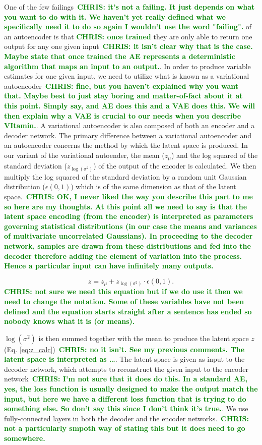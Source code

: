 \documentclass[%
showpacs,
 amsmath,amssymb,
 aps,
 twocolumn,
 prl,
 reprint,
floatfix,
]{revtex4-1}
\newcommand{\chris}[1]{\textbf{\textcolor{green}{CHRIS: #1}}}
\begin{document}
%
%
One of the few failings~\chris{it's not a failing. It just depends on what you
want to do with it. We haven't yet really defined what we specifically need it
to do so again I wouldn't use the word "failing".} of an autoencoder is that
\chris{once trained} they are only able to return one output for any one given
input~\chris{it isn't clear why that is the case. Maybe state that once trained
the AE represents a deterministic algorithm that maps an input to an output.}.
In order to produce variable estimates for one given input, we need to utilize
what is known as a variational autoencoder~\cite{1812.04405}\chris{fine, but
you haven't explained why you want that. Maybe best to just stay boring and
matter-of-fact about it at this point. Simply say, and AE does this and a VAE
does this. We will then explain why a VAE is crucial to our needs when you
describe VItamin.}. A variational autoencoder is also composed of both an
encoder and a decoder network. The primary difference between a variational
autoencoder and an autoencoder concerns the method by which the latent space is
produced. In our variant of the variational autoender, the mean ($z_{\mu}$) and
the log squared of the standard deviation ($z_{\log{(\sigma^{2})}}$) of the
output of the encoder is calculated. We then multiply the log squared of the
standard deviation by a random unit Gaussian distribution ($\epsilon(0,1)$)
which is of the same dimension as that of the latent space.~\chris{OK, I never
liked the way you describe this part to me so here are my thoughts. At this
point all we need to say is that the latent space encoding (from the encoder)
is interpreted as parameters governing statistical distributions (in our case
the means and variances of multivariate uncorrelated Gaussians). In proceeding
to the decoder network, samples are drawn from these distributions and fed into
the decoder therefore adding the element of variation into the process. Hence a
particular input can have infinitely many outputs.}

\begin{equation}
    z = z_{\mu} + z_{\log{(\sigma^{2})}} \cdot \epsilon(0,1).\label{eq:z_calc}
\end{equation}
\chris{not sure we need this equation but if we do use it then we need to
change the notation. Some of these variables have not been defined and the equation
starts straight after a sentence has ended so nobody knows what it is (or
means).}

$\log{(\sigma^{2})}$ is then summed together with the mean to produce the
latent space $z$ (Eq. \ref{eq:z_calc})~\chris{no it isn't. See my previous
comments. The latent space is interpreted as \ldots}. The latent space is given
as input to the decoder network, which attempts to reconstruct the given input
to the encoder network~\chris{I'm not sure that it does do this. In a standard
AE, yes, the loss function is usually designed to make the output match the
input, but here we have a different loss function that is trying to do
something else.  So don't say this since I don't think it's true.}. We use
fully-connected layers in both the decoder and the encoder networks.~\chris{not
a particularly smpoth way of stating this but it does need to go somewhere.}
\end{document}
